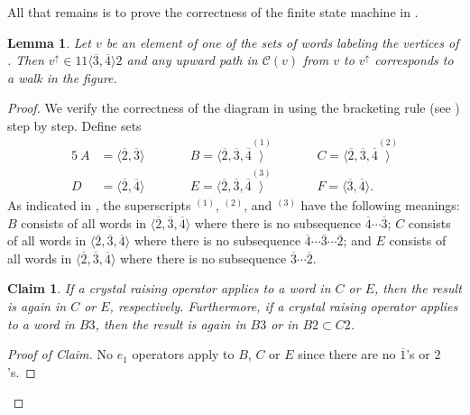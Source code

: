 \documentclass{amsart}
\newtheorem{lemma}[theorem]{Lemma}
\newtheorem*{claim}{Claim}
\theoremstyle{definition}
\theoremstyle{remark}
\numberwithin{equation}{section}
\begin{document}
All that remains is to prove the correctness of the finite state machine in . 

\begin{lemma}\label{lem:long-degens-DFA-412p3p4}
Let $v$ be an element of one of the sets of words labeling the vertices of . Then $v^\uparrow \in 11\langle \overline{3}, \overline{4} \rangle2$ and any upward path in $\mathcal{C}(v)$ from $v$ to $v^{\uparrow}$ corresponds to a walk in the figure.
\end{lemma}

\begin{proof}
  We verify the correctness of the diagram in  using the bracketing rule (see ) step by step. Define sets
  \begin{alignat*}{5}\
    A &= \langle\overline{2}, \overline{3}\rangle &&\qquad
    B = \langle\overline{2}, \overline{3}, \overline{4}\overset{\scriptscriptstyle{(1)}}{\rangle} &&\qquad
    C = \langle\overline{2}, \overline{3}, \overline{4}\overset{\scriptscriptstyle{(2)}}{\rangle} \\
    D &= \langle\overline{2}, \overline{4}\rangle &&\qquad
    E = \langle\overline{2}, \overline{3}, \overline{4}\overset{\scriptscriptstyle{(3)}}{\rangle} &&\qquad
    F = \langle\overline{3}, \overline{4}\rangle.
  \end{alignat*}
As indicated in , the superscripts $^{\scriptscriptstyle{(1)}}$, $^{\scriptscriptstyle{(2)}}$, and $^{\scriptscriptstyle{(3)}}$ have the following meanings: $B$ consists of all words in $\langle\overline{2}, \overline{3}, \overline{4}\rangle$ where there is no subsequence $\overline{4}\cdots\overline{3}$; $C$ consists of all words in $\langle\overline{2}, \overline{3}, \overline{4}\rangle$ where there is no subsequence $\overline{4}\cdots\overline{3}\cdots\overline{2}$; and $E$ consists of all words in $\langle\overline{2}, \overline{3}, \overline{4}\rangle$ where there is no subsequence $\overline{3}\cdots\overline{2}$.
  
\begin{claim} 
If a crystal raising operator applies to a word in $C$ or $E$, then the result is again in $C$ or $E$, respectively. Furthermore, if a crystal raising operator applies to a word in $B3$, then the result is again in $B3$ or in $B2 \subset C2$.
\end{claim}

\begin{proof}[Proof of Claim]
No $e_1$ operators apply to $B$, $C$ or $E$ since there are no $\overline{1}$'s or $2$'s.


\end{proof}
\end{proof}
\end{document}
